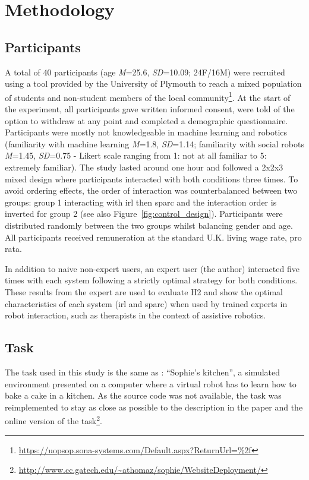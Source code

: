 \section{Methodology}
\subsection{Participants}

A total of 40 participants (age \textit{M}=25.6, \textit{SD}=10.09; 24F/16M) were recruited using a tool provided by the University of Plymouth to reach a mixed population of students and non-student members of the local community\footnote{\url{https://uopsop.sona-systems.com/Default.aspx?ReturnUrl=\%2f}}. At the start of the experiment, all participants gave written informed consent, were told of the option to withdraw at any point and completed a demographic questionnaire. Participants were mostly not knowledgeable in machine learning and robotics (familiarity with machine learning \textit{M}=1.8, \textit{SD}=1.14; familiarity with social robots \textit{M}=1.45, \textit{SD}=0.75 - Likert scale ranging from 1: not at all familiar to 5: extremely familiar). The study lasted around one hour and followed a 2x2x3 mixed design where participants interacted with both conditions three times. To avoid ordering effects, the order of interaction was counterbalanced between two groups: group 1 interacting with \gls{irl} then \gls{sparc} and the interaction order is inverted for group 2 (see also Figure~\ref{fig:control_design}). Participants were distributed randomly between the two groups whilst balancing gender and age. All participants received remuneration at the standard U.K. living wage rate, pro rata. 

In addition to naive non-expert users, an expert user (the author) interacted five times with each system following a strictly optimal strategy for both conditions. These results from the expert are used to evaluate H2 and show the optimal characteristics of each system (\gls{irl} and \gls{sparc}) when used by trained experts in robot interaction, such as therapists in the context of assistive robotics.


\subsection{Task} \label{ssec:control_task}

The task used in this study is the same as \cite{thomaz2008teachable}: ``Sophie's kitchen'', a simulated environment presented on a computer where a virtual robot has to learn how to bake a cake in a kitchen. As the source code was not available, the task was reimplemented to stay as close as possible to the description in the paper and the online version of the task\footnote{\url{http://www.cc.gatech.edu/~athomaz/sophie/WebsiteDeployment/}}.

